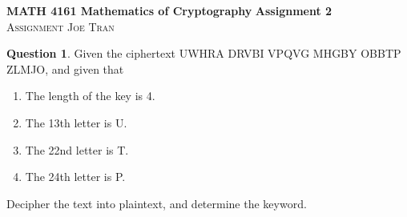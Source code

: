 \documentclass[11pt]{amsart}
\theoremstyle{definition}\newtheorem{question}{Question}
\theoremstyle{definition}\newtheorem*{solution}{Solution}
\begin{document}
\noindent \textbf{MATH 4161 Mathematics of Cryptography} \hfill \textbf{Assignment 2} \\
\textsc{Assignment} \hfill \textsc{Joe Tran}

\begin{question}
    Given the ciphertext \textsf{UWHRA DRVBI VPQVG MHGBY OBBTP ZLMJO}, and given that
    \begin{enumerate}
        \item The length of the key is \textsf{4}.
        \item The 13th letter is \textsf{U}.
        \item The 22nd letter is \textsf{T}.
        \item The 24th letter is \textsf{P}.
    \end{enumerate}
    Decipher the text into plaintext, and determine the keyword.
\end{question}
\end{document}

